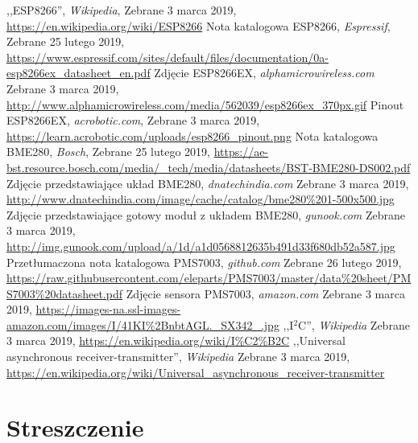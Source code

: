 \documentclass[12pt,a4paper,oneside]{memoir}
\begin{document}
\newpage
\listoffigures
\newpage
\listoftables
\newpage
\begin{thebibliography}{12}
	,,ESP8266'',
	\textit{Wikipedia},
	Zebrane 3 marca 2019,
	\url{https://en.wikipedia.org/wiki/ESP8266}
	Nota katalogowa ESP8266,
	\textit{Espressif},
	Zebrane 25 lutego 2019,
	\url{https://www.espressif.com/sites/default/files/documentation/0a-esp8266ex_datasheet_en.pdf}
	Zdjęcie ESP8266EX,
	\textit{alphamicrowireless.com}
	Zebrane 3 marca 2019,
	\url{http://www.alphamicrowireless.com/media/562039/esp8266ex_370px.gif}
	Pinout ESP8266EX,
	\textit{acrobotic.com},
	Zebrane 3 marca 2019,
	\url{https://learn.acrobotic.com/uploads/esp8266_pinout.png}
	Nota katalogowa BME280,
	\textit{Bosch},
	Zebrane 25 lutego 2019,
	\url{https://ae-bst.resource.bosch.com/media/_tech/media/datasheets/BST-BME280-DS002.pdf}
	Zdjęcie przedstawiające układ BME280,
	\textit{dnatechindia.com}
	Zebrane 3 marca 2019,
	\url{http://www.dnatechindia.com/image/cache/catalog/bme280\%201-500x500.jpg}
	Zdjęcie przedstawiające gotowy moduł z układem BME280,
	\textit{gunook.com}
	Zebrane 3 marca 2019,
	\url{http://img.gunook.com/upload/a/1d/a1d0568812635b491d33f680db52a587.jpg}
	Przetłumaczona nota katalogowa PMS7003,
	\textit{github.com}
	Zebrane 26 lutego 2019,
	\url{https://raw.githubusercontent.com/eleparts/PMS7003/master/data\%20sheet/PMS7003\%20datasheet.pdf}
	Zdjęcie sensora PMS7003,
	\textit{amazon.com}
	Zebrane 3 marca 2019,
	\url{https://images-na.ssl-images-amazon.com/images/I/41KI\%2BnbtAGL._SX342_.jpg}
	,,I$^2$C'',
	\textit{Wikipedia}
	Zebrane 3 marca 2019,
	\url{https://en.wikipedia.org/wiki/I%C2%B2C}
	,,Universal asynchronous receiver-transmitter'', 
	\textit{Wikipedia}
	Zebrane 3 marca 2019,
	\url{https://en.wikipedia.org/wiki/Universal_asynchronous_receiver-transmitter}
	
\end{thebibliography}

\newpage
\chapter{Streszczenie} 
\end{document}
